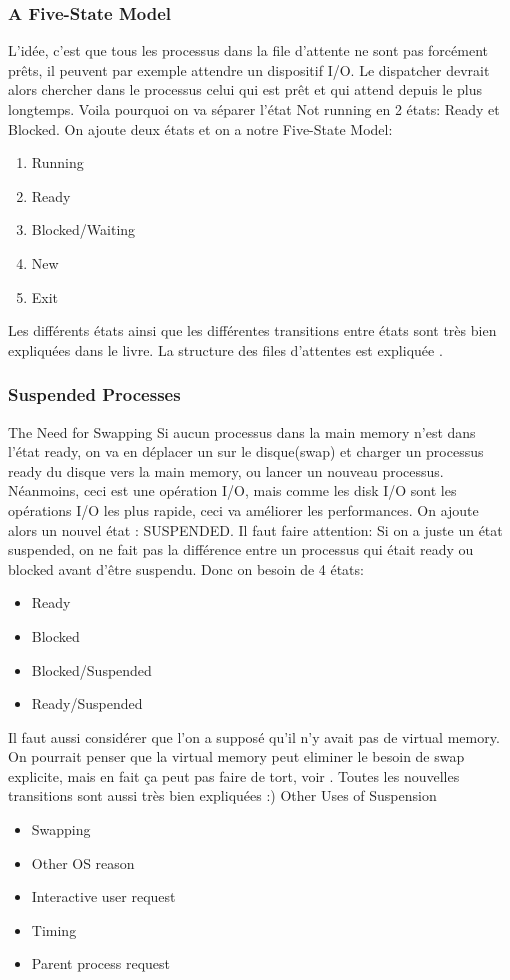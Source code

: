 \subsubsection{A Five-State Model}
L'idée, c'est que tous les processus dans la file d'attente ne sont pas forcément prêts, il peuvent par exemple attendre un dispositif I/O.
Le dispatcher devrait alors chercher dans le processus celui qui est prêt et qui attend depuis le plus longtemps.
Voila pourquoi on va séparer l'état Not running en 2 états: Ready et Blocked.
On ajoute deux états et on a notre Five-State Model:
\begin{enumerate}
  \item Running
  \item Ready
  \item Blocked/Waiting
  \item New
  \item Exit
\end{enumerate}
Les différents états ainsi que les différentes transitions entre états sont très bien expliquées dans le livre.
La structure des files d'attentes est expliquée \cite[p.~140]{stallings}.

\subsubsection{Suspended Processes}
The Need for Swapping
Si aucun processus dans la main memory n'est dans l'état ready, on va en déplacer un sur le disque(swap) et charger un processus ready du disque vers la main memory, ou lancer un nouveau processus.
Néanmoins, ceci est une opération I/O, mais comme les disk I/O sont les opérations I/O les plus rapide, ceci va améliorer les performances.
On ajoute alors un nouvel état : SUSPENDED.
Il faut faire attention: Si on a juste un état suspended, on ne fait pas la différence entre un processus qui était ready ou blocked avant d'être suspendu.
Donc on besoin de 4 états:
\begin{itemize}
  \item Ready
  \item Blocked
  \item Blocked/Suspended
  \item Ready/Suspended
\end{itemize}
Il faut aussi considérer que l'on a supposé qu'il n'y avait pas de virtual memory.
On pourrait penser que la virtual memory peut eliminer le besoin de swap explicite, mais en fait ça peut pas faire de tort, voir \cite[p.~142]{stallings}.
Toutes les nouvelles transitions sont aussi très bien expliquées :)
Other Uses of Suspension
\begin{itemize}
  \item Swapping
  \item Other OS reason
  \item Interactive user request
  \item Timing
  \item Parent process request
\end{itemize}

